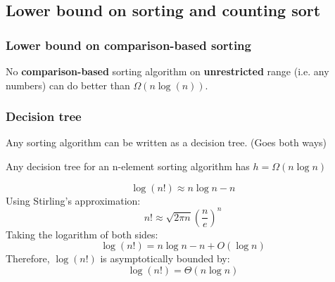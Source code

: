 \subsection{Lower bound on sorting and counting sort}
    \subsubsection{Lower bound on comparison-based sorting}
    \begin{definition}
        No \textbf{comparison-based} sorting algorithm on \textbf{unrestricted} range (i.e. any numbers) can do better than $\Omega(n\log(n))$.    
    \end{definition}

    \subsubsection{Decision tree}
    \begin{definition}
        Any sorting algorithm can be written as a decision tree. (Goes both ways)
    \end{definition}

    \begin{example}
    \end{example}

    \begin{theorem}
        Any decision tree for an n-element sorting algorithm has $h=\Omega (n\log n)$
    \end{theorem}

    \begin{derivation}
        \[
        \log(n!) \approx n \log n - n
        \]
        Using Stirling's approximation:
        \[
        n! \approx \sqrt{2\pi n} \left( \frac{n}{e} \right)^n
        \]
        Taking the logarithm of both sides:
        \[
        \log(n!) = n \log n - n + O(\log n)
        \]
        Therefore, \(\log(n!)\) is asymptotically bounded by:
        \[
        \log(n!) = \Theta(n \log n)
        \]
    \end{derivation}

